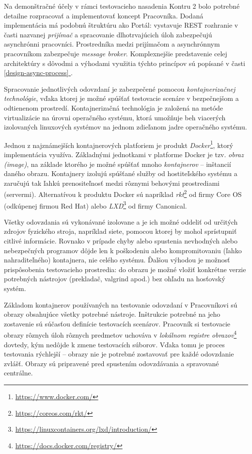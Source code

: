 \documentclass[
  digital, %
  oneside, %
  table,   %
  lof,     %
  lot,   %
]{fithesis3}
\newcommand*{\fullref}[1]{\hyperref[{#1}]{\ref*{#1} \nameref*{#1}}}
\newcommand*{\footurl}[1]{\footnote{\url{#1}}}
\begin{document}
Na demonštračné účely v rámci testovacieho nasadenia Kontru 2 bolo potrebné detailne rozpracovať a implementovať koncept Pracovníka. Dodaná implementácia má podobnú štruktúru ako Portál: vystavuje REST rozhranie v časti nazvanej \emph{prijímač} a spracovanie dlhotrvajúcich úloh zabezpečujú asynchrónni pracovníci. Prostredníka medzi prijímačom a asynchrónnym pracovníkom zabezpečuje \emph{message broker}. Komplexnejšie predstavenie celej architektúry s dôvodmi a výhodami využitia týchto princípov sú popísané v časti \fullref{design-async-process}. 

Spracovanie jednotlivých odovzdaní je zabezpečené pomocou \emph{kontajnerizačnej technológie}, vďaka ktorej je možné spúšťať testovacie scenáre v bezpečnejšom a odtienenom prostredí. Kontajnerizačná technológia je založená na metóde virtualizácie na úrovni operačného systému, ktorá umožňuje beh viacerých izolovaných linuxových systémov na jednom zdieľanom jadre operačného systému\cite{linux-containers-rh}. 

Jednou z najznámejších kontajnerových platforiem je produkt \emph{Docker}\footnote{\url{https://www.docker.com/}}, ktorý implementácia využíva. Základnými jednotkami v platforme Docker je tzv. \emph{obraz (image)}, na základe ktorého je možné spúšťať mnoho \emph{kontajnerov} -- inštancií daného obrazu. Kontajnery izolujú spúšťané služby od hostiteľského systému a zaručujú tak ľahkú prenositeľnosť medzi rôznymi behovými prostrediami (servermi)\cite{docker-stuff}. Alternatívou k produktu Docker sú napríklad \emph{rkt}\footurl{https://coreos.com/rkt/} od firmy Core OS (odkúpenej firmou Red Hat) alebo \emph{LXD}\footurl{https://linuxcontainers.org/lxd/introduction/} od firmy Canonical. 

Všetky odovzdania sú vykonávané izolovane a je ich možné oddeliť od určitých zdrojov fyzického stroja, napríklad siete, pomocou ktorej by mohol sprístupniť citlivé informácie. Rovnako v prípade chyby alebo spustenia nevhodných alebo nebezpečných programov dôjde len k poškodeniu alebo kompromitovaniu (ľahko nahraditeľného) kontajnera, nie celého systému. Ďalšou výhodou je možnosť prispôsobenia testovacieho prostredia: do obrazu je možné vložiť konkrétne verzie potrebných nástrojov (prekladač, valgrind apod.) bez ohľadu na hosťovský systém.

Základom kontajnerov používaných na testovanie odovzdaní v Pracovníkovi sú obrazy obsahujúce všetky potrebné nástroje. Inštrukcie potrebné na jeho zostavenie sú súčasťou definície testovacích scenárov. Pracovník si testovacie obrazy rôznych úloh rôznych predmetov uchováva v \emph{lokálnom registre obrazov}\footnote{\url{https://docs.docker.com/registry/}} dovtedy, kým nedôjde k zmene testovacích súborov. Vďaka tomu je proces testovania rýchlejší -- obrazy nie je potrebné zostavovať pre každé odovzdanie zvlášť. Obrazy sú pripravené pred spustením odovzdávania a spravované centrálne.
\end{document}
